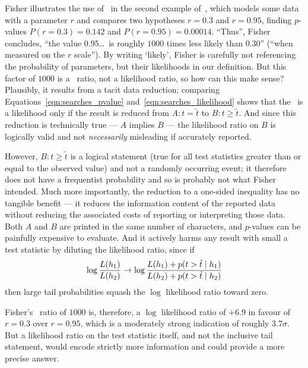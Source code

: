 Fisher illustrates the use of \pvalues\ in the second example
of~\cite{fisher1921probable}, which models some data with a parameter $r$ and
compares two hypotheses
$r=0.3$ and
$r=0.95$, finding $p$-values
$P(r=0.3)=0.142$ and
$P(r=0.95)=0.00014$.
``Thus'', Fisher concludes, ``the value $0.95$\ldots\ is roughly $1000$ times
less likely than $0.30$''
(``when measured on the $r$ scale'').
By writing `likely', Fisher is carefully not referencing the probability
of parameters, but their likelihoods in our definition.
But this factor of $1000$ is a \pvalue\ ratio, not a likelihood ratio,
so how can this make sense?
Plausibly, it results from a tacit data reduction; comparing
Equations~\ref{eqn:searches_pvalue} and~\ref{eqn:searches_likelihood}
shows that the \pvalue\ is a likelihood only if the result is reduced from
$A: t =    \tilde{t}$ to
$B: t \geq \tilde{t}$.
And since this reduction is technically true --- $A$ implies $B$ --- the
likelihood ratio on $B$ is logically valid and not \emph{necessarily}
misleading if accurately reported.

However, $B: t \geq \tilde{t}$ is a logical statement (true for all test
statistics greater than or equal to the observed value) and not a randomly
occurring event; it therefore does not have a frequentist probability and so
is probably not what Fisher intended.
Much more importantly, the reduction to a one-sided inequality has no tangible
benefit --- it reduces the information content of the reported data without
reducing the associated costs of reporting or interpreting those data.
Both $A$ and $B$ are printed in the same number of characters, and $p$-values
can be painfully expensive to evaluate.
And it actively harms any result with small a test statistic by
diluting the likelihood ratio, since if
\begin{equation}
\log \frac{L(h_1)}{L(h_2)}
\to
\log \frac{
L(h_1) + p(t > \tilde{t} \mid h_1)
}
{
L(h_2) + p(t > \tilde{t} \mid h_2)
}
\end{equation}
then large tail probabilities squash the $\log$ likelihood ratio toward zero.

Fisher's \pvalue\ ratio of $1000$ is, therefore, a $\log$ likelihood
ratio of $+6.9$ in favour of $r=0.3$ over $r=0.95$, which is a moderately
strong  indication of roughly $3.7\sigma$.
But a likelihood ratio on the test statistic itself, and not the inclusive
tail statement, would encode strictly more information and could provide a
more precise answer.

